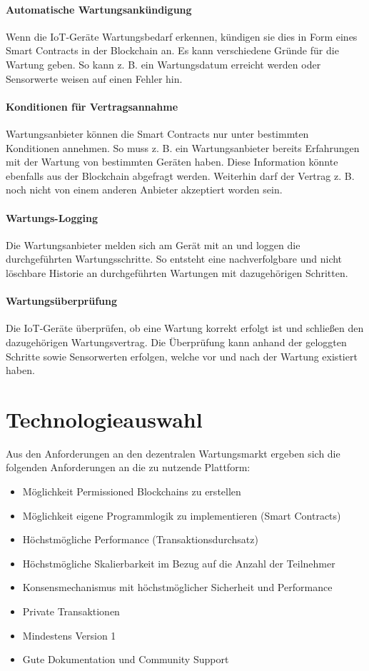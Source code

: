 \paragraph{Automatische Wartungsankündigung}
Wenn die IoT-Geräte Wartungsbedarf erkennen, kündigen sie dies in Form eines Smart Contracts in der Blockchain an. Es kann verschiedene Gründe für die Wartung geben. So kann z. B. ein Wartungsdatum erreicht werden oder Sensorwerte weisen auf einen Fehler hin.

\paragraph{Konditionen für Vertragsannahme}
Wartungsanbieter können die Smart Contracts nur unter bestimmten Konditionen annehmen. So muss z. B. ein Wartungsanbieter bereits Erfahrungen mit der Wartung von bestimmten Geräten haben. Diese Information könnte ebenfalls aus der Blockchain abgefragt werden. Weiterhin darf der Vertrag z. B. noch nicht von einem anderen Anbieter akzeptiert worden sein. 

\paragraph{Wartungs-Logging}
Die Wartungsanbieter melden sich am Gerät mit an und loggen die durchgeführten Wartungsschritte. So entsteht eine nachverfolgbare und nicht löschbare Historie an durchgeführten Wartungen mit dazugehörigen Schritten.

\paragraph{Wartungsüberprüfung}
Die IoT-Geräte überprüfen, ob eine Wartung korrekt erfolgt ist und schließen den dazugehörigen Wartungsvertrag. Die Überprüfung kann anhand der geloggten Schritte sowie Sensorwerten erfolgen, welche vor und nach der Wartung existiert haben.

\section{Technologieauswahl}
Aus den Anforderungen an den dezentralen Wartungsmarkt ergeben sich die folgenden Anforderungen an die zu nutzende Plattform: 

\begin{itemize}
    \item Möglichkeit Permissioned Blockchains zu erstellen
    \item Möglichkeit eigene Programmlogik zu implementieren (Smart Contracts)
    \item Höchstmögliche Performance (Transaktionsdurchsatz)
    \item Höchstmögliche Skalierbarkeit im Bezug auf die Anzahl der Teilnehmer
    \item Konsensmechanismus mit höchstmöglicher Sicherheit und Performance
    \item Private Transaktionen   
    \item Mindestens Version 1
    \item Gute Dokumentation und Community Support
\end{itemize}


